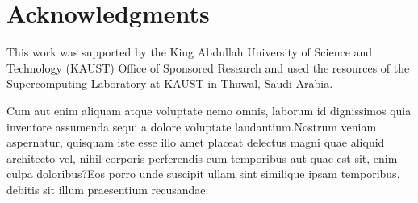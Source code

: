 \documentclass[letterpaper]{article}
\begin{document}
\section{Acknowledgments}
This work was supported by the King Abdullah University of Science and Technology (KAUST) Office of Sponsored Research and used the resources of the Supercomputing Laboratory at KAUST in Thuwal, Saudi Arabia.

{\small
Cum aut enim aliquam atque voluptate nemo omnis, laborum id dignissimos quia inventore assumenda sequi a dolore voluptate laudantium.Nostrum veniam aspernatur, quisquam iste esse illo amet placeat delectus magni quae aliquid architecto vel, nihil corporis perferendis eum temporibus aut quae est sit, enim culpa doloribus?Eos porro unde suscipit ullam sint similique ipsam temporibus, debitis sit illum praesentium recusandae.\clearpage


}
\end{document}
